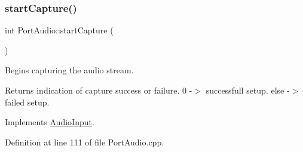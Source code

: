 \subsubsection{\texorpdfstring{start\+Capture()}{startCapture()}}
{\footnotesize\ttfamily int Port\+Audio\+::start\+Capture (\begin{DoxyParamCaption}{ }\end{DoxyParamCaption})\hspace{0.3cm}{\ttfamily [virtual]}}

Begins capturing the audio stream. \begin{DoxyReturn}{Returns}
indication of capture success or failure. 0 -\/$>$ successfull setup. else -\/$>$ failed setup. 
\end{DoxyReturn}


Implements \mbox{\hyperlink{classAudioInput_afa753742035f7069f5ef0c2ece6a62fe}{Audio\+Input}}.



Definition at line 111 of file Port\+Audio.\+cpp.


